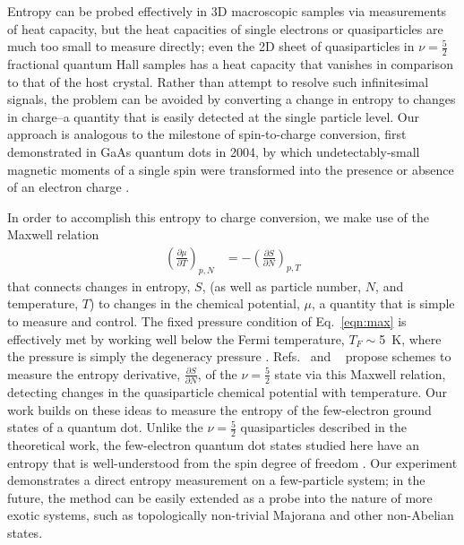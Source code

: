 \documentclass[twocolumn,showpacs,preprintnumbers,amsmath,amssymb,pra,aps,superscriptaddress]{revtex4-1}
\begin{document}
Entropy can be probed effectively in 3D macroscopic samples via measurements of heat capacity, but the heat capacities of single electrons or quasiparticles are much too small to measure directly; even the 2D sheet of quasiparticles in $\nu = \frac{5}{2}$ fractional quantum Hall samples has a heat capacity that vanishes in comparison to that of the host crystal.  Rather than attempt to resolve such infinitesimal signals, the problem can be avoided by converting a change in entropy to changes in charge--a quantity that is easily detected at the single particle level.  Our approach is analogous to the milestone of spin-to-charge conversion, first demonstrated in GaAs quantum dots in 2004, by which undetectably-small magnetic moments of a single spin were transformed into the presence or absence of an electron charge \cite{Elzerman2004, Ono2004}.

In order to accomplish this entropy to charge conversion, we make use of the Maxwell relation
%
\begin{align}
\label{eqn:max}
        \left(\frac{\partial \mu}{\partial T}\right)_{p,N} &= -\left(\frac{\partial S}{\partial N}\right)_{p,T}
\end{align}
%
that connects changes in entropy, $S$, (as well as particle number, $N$, and temperature, $T$) to changes in the chemical potential, $\mu$, a quantity that is simple to measure and control. The fixed pressure condition of Eq.~\ref{eqn:max} is effectively met by working well below the Fermi temperature, $T_F \sim$\SI{5}{\kelvin}, where the pressure is simply the degeneracy pressure \cite{Landau1969}. Refs.~ and ~ propose schemes to measure the entropy derivative, $\frac{\partial S}{\partial N}$, of the $\nu = \frac{5}{2}$ state via this Maxwell relation, detecting changes in the quasiparticle chemical potential with temperature.  Our work builds on these ideas to measure the entropy of the few-electron ground states of a quantum dot. Unlike the $\nu = \frac{5}{2}$ quasiparticles described in the theoretical work, the few-electron quantum dot states studied here have an entropy that is well-understood from the spin degree of freedom \cite{Tarucha1996, Ciorga2000, Duncan2000, Lindemann2002, Potok2003, Hofmann2016}. Our experiment demonstrates a direct entropy measurement on a few-particle system; in the future, the method can be easily extended as a probe into the nature of more exotic systems, such as topologically non-trivial Majorana and other non-Abelian states.
\end{document}
